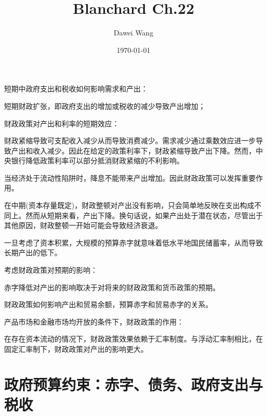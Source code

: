 \documentclass{article}
\title{Blanchard Ch.22}
\author{Dawei Wang}
\date{\today}
\begin{document}
	\maketitle

短期中政府支出和税收如何影响需求和产出：

短期财政扩张，即政府支出的增加或税收的减少导致产出增加；

\hspace*{\fill}

财政政策对产出和利率的短期效应：

财政紧缩导致可支配收入减少从而导致消费减少。需求减少通过乘数效应进一步导致产出和收入减少。因此在给定的政策利率下，财政紧缩导致产出下降。然而，中央银行降低政策利率可以部分抵消财政紧缩的不利影响。

\hspace*{\fill}

当经济处于流动性陷阱时，降息不能带来产出增加。因此财政政策可以发挥重要作用。

\hspace*{\fill}

在中期(资本存量既定)，财政整顿对产出没有影响，只会简单地反映在支出构成不同上。然而从短期来看，产出下降。换句话说，如果产出处于潜在状态，尽管出于其他原因，财政整顿一开始可能会导致经济衰退。

\hspace*{\fill}

一旦考虑了资本积累，大规模的预算赤字就意味着低水平地国民储蓄率，从而导致长期产出的低下。

\hspace*{\fill}

考虑财政政策对预期的影响：

赤字降低对产出的影响取决于对将来的财政政策和货币政策的预期。

\hspace*{\fill}

财政政策如何影响产出和贸易余额，预算赤字和贸易赤字的关系。

\hspace*{\fill}

产品市场和金融市场均开放的条件下，财政政策的作用：

在存在资本流动的情况下，财政政策效果依赖于汇率制度。与浮动汇率制相比，在固定汇率制下，财政政策对产出的影响更大。

\section{政府预算约束：赤字、债务、政府支出与税收}
\end{document}
